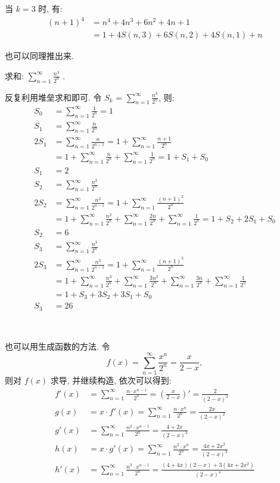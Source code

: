 当 $ k = 3 $ 时, 有:
\begin{align*} 
(n+1)^4 &= n^4 + 4n^3 + 6n^2 + 4n + 1 \\
		&= 1 + 4S(n,3) + 6S(n,2) + 4S(n,1) + n
\end{align*} 

也可以同理推出来.

\newpage
求和: 
$\displaystyle \sum_{n=1}^{\infty}{\frac{n^3}{2^n}}$ .

\noindent 反复利用堆垒求和即可. 令 $S_k$ = $\displaystyle \sum_{n=1}^{\infty}{\frac{n^k}{2^n}}$, 则:
\begin{align*}
S_0 &= \sum_{n=1}^{\infty}{\frac{1}{2^n}} = 1 \\
S_1 &= \sum_{n=1}^{\infty}{\frac{n}{2^n}} \\
2S_1 &= \sum_{n=1}^{\infty}{\frac{n}{2^{n-1}}} = 1+\sum_{n=1}^{\infty}{\frac{n+1}{2^{n}}} \\
&= 1+\sum_{n=1}^{\infty}{\frac{n}{2^{n}}} + \sum_{n=1}^{\infty}{\frac{1}{2^{n}}} = 1 + S_1 + S_0\\
S_1 &= 2 \\
S_2 &= \sum_{n=1}^{\infty}{\frac{n^2}{2^n}} \\
2S_2 &= \sum_{n=1}^{\infty}{\frac{n^2}{2^{n-1}}} = 1 + \sum_{n=1}^{\infty}{\frac{(n+1)^2}{2^n}}\\ 
&= 1 + \sum_{n=1}^{\infty}{\frac{n^2}{2^n}} + \sum_{n=1}^{\infty}{\frac{2n}{2^n}} + \sum_{n=1}^{\infty}{\frac{1}{2^n}} = 1 + S_2 + 2S_1 + S_0 \\
S_2 &= 6 \\
S_3 &= \sum_{n=1}^{\infty}{\frac{n^3}{2^n}} \\
2S_3 &=   \sum_{n=1}^{\infty}{\frac{n^3}{2^{n-1}}} = 1 + \sum_{n=1}^{\infty}{\frac{(n+1)^3}{2^n}} \\
&= 1 +  \sum_{n=1}^{\infty}{\frac{n^3}{2^n}} +  \sum_{n=1}^{\infty}{\frac{3n^2}{2^n}} +  \sum_{n=1}^{\infty}{\frac{3n}{2^n}} +  \sum_{n=1}^{\infty}{\frac{1}{2^n}} \\
&= 1 + S_3 + 3S_2 + 3S_1 + S_0\\
S_3 &= 26
\end{align*}

~

\noindent 也可以用生成函数的方法. 令 
\[f(x) =  \sum_{n=1}^{\infty}{\frac{x^n}{2^n}} = \frac{x}{2-x} ,\]
则对 $f(x)$ 求导, 并继续构造, 依次可以得到:
\begin{align*}
f'(x) &=  \sum_{n=1}^{\infty}{\frac{n\cdot x^{n-1}}{2^n}} = \left( \frac{x}{2-x} \right)' = \frac{2}{(2-x)^2} \\
g(x) &= x\cdot f'(x) = \sum_{n=1}^{\infty}{\frac{n\cdot x^n}{2^n}} = \frac{2x}{(2-x)^2} \\
g'(x) &= \sum_{n=1}^{\infty}{\frac{n^2 \cdot x^{n-1}}{2^n}} = \frac{4+2x}{(2-x)^3} \\
h(x) &= x\cdot g'(x) = \sum_{n=1}^{\infty}{\frac{n^2\cdot x^n}{2^n}} = \frac{4x+2x^2}{(2-x)^3} \\
h'(x) &= \sum_{n=1}^{\infty}{\frac{n^3\cdot x^{n-1}}{2^n}} = \frac{(4+4x)(2-x)+3(4x+2x^2)}{(2-x)^4}
\end{align*}

